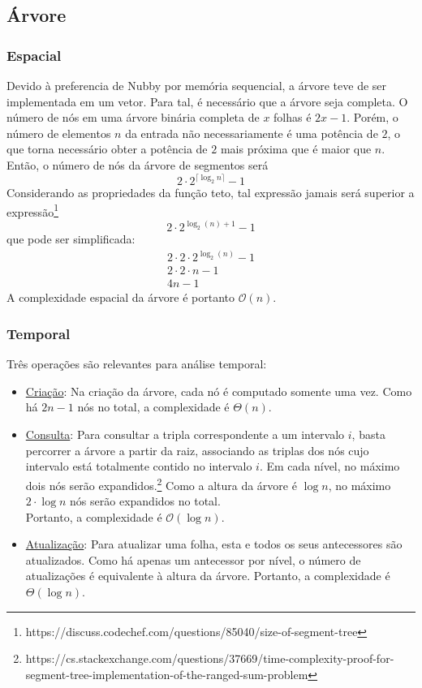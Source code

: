 \documentclass{article}
\begin{document}
\subsection{Árvore}

\subsubsection{Espacial}
Devido à preferencia de Nubby por memória sequencial, a árvore teve de ser implementada em um vetor. Para tal, é necessário que a árvore seja completa. O número de nós em uma árvore binária completa de $x$ folhas é $2x - 1$. Porém, o número de elementos $n$ da entrada não necessariamente é uma potência de $2$, o que torna necessário obter a potência de $2$ mais próxima que é maior que $n$. Então, o número de nós da árvore de segmentos será 
\[ 2 \cdot 2^{\lceil \log_2 n \rceil} - 1 \]
Considerando as propriedades da função teto, tal expressão jamais será superior a expressão\footnote{\label{link1}https://discuss.codechef.com/questions/85040/size-of-segment-tree} \\
\[ 2 \cdot 2^{\log_2(n) + 1} - 1 \]
que pode ser simplificada:
\begin{gather*}
  2 \cdot 2 \cdot 2^{\log_2(n)} - 1 \\
  2 \cdot 2 \cdot n - 1 \\
  4n - 1
\end{gather*}
A complexidade espacial da árvore é portanto $\mathcal{O}(n)$.

\subsubsection{Temporal}
Três operações são relevantes para análise temporal:
\vspace{-5pt}
\begin{itemize}
  \item \uline{Criação}: Na criação da árvore, cada nó é computado somente uma vez. Como há $2n - 1$ nós no total, a complexidade é $\Theta(n)$.

  \item \uline{Consulta}: Para consultar a tripla correspondente a um intervalo $i$, basta percorrer a árvore a partir da raiz, associando as triplas dos nós cujo intervalo está totalmente contido no intervalo $i$. Em cada nível, no máximo dois nós serão expandidos.\footnote{\label{link2}https://cs.stackexchange.com/questions/37669/time-complexity-proof-for-segment-tree-implementation-of-the-ranged-sum-problem} Como a altura da árvore é $\log n$, no máximo $2 \cdot \log n$ nós serão expandidos no total. \\ Portanto, a complexidade é $\mathcal{O}(\log n)$.
  
  \item \uline{Atualização}: Para atualizar uma folha, esta e todos os seus antecessores são atualizados. Como há apenas um antecessor por nível, o número de atualizações é equivalente à altura da árvore. Portanto, a complexidade é $\Theta(\log n)$.
\end{itemize}
\end{document}
